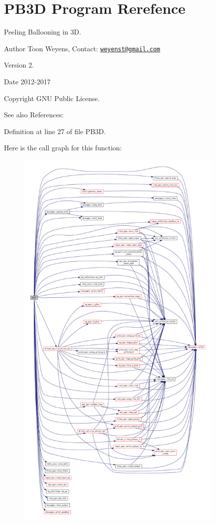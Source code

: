 \hypertarget{PB3D_8f90}{}\section{P\+B3\+D Program Rerefence}
\label{PB3D_8f90}



Peeling Ballooning in 3D. 

\begin{DoxyAuthor}{Author}
Toon Weyens, Contact\+: \href{mailto:weyenst@gmail.com}{\tt weyenst@gmail.\+com} 
\end{DoxyAuthor}
\begin{DoxyVersion}{Version}
2. 
\end{DoxyVersion}
\begin{DoxyDate}{Date}
2012-\/2017 
\end{DoxyDate}
\begin{DoxyCopyright}{Copyright}
G\+NU Public License. 
\end{DoxyCopyright}
\begin{DoxySeeAlso}{See also}
References\+: \cite{weyens2014theory} \cite{Weyens2017PB3D} 
\end{DoxySeeAlso}


Definition at line 27 of file P\+B3\+D.

Here is the call graph for this function\+:\nopagebreak
\begin{figure}[H]
\begin{center}
\leavevmode
\includegraphics[height=550pt]{PB3D_8f90_afaee01f014ab3398eecac996b2795fd2_cgraph}
\end{center}
\end{figure}
